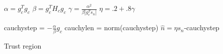 \begin{algorithm}[H]
\DontPrintSemicolon
{}

$\alpha = g_c^Tg_c$\;
$\beta = g_c^TH_cg_c$\;
$\gamma = \frac{\alpha^2}{\beta|g_c^Ts_n|}$\;
$\eta   = .2 + .8\gamma$\;

cauchystep  = $-\frac{\alpha}{\beta}g_c$\;
cauchylen = norm(cauchystep)\;
$\hat{n}  = \eta s_n$-cauchystep\;
\caption{Trust region}
\end{algorithm}
